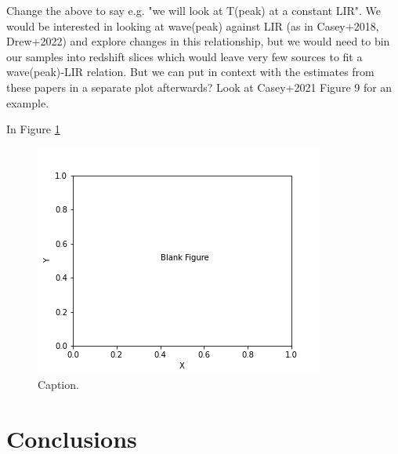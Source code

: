 {\color{red} Change the above to say e.g. "we will look at T(peak) at a constant LIR". We would be interested in looking at wave(peak) against LIR (as in Casey+2018, Drew+2022) and explore changes in this relationship, but we would need to bin our samples into redshift slices which would leave very few sources to fit a wave(peak)-LIR relation. But we can put in context with the estimates from these papers in a separate plot afterwards? Look at Casey+2021 Figure 9 for an example.}

In Figure \ref{fig:wavepeak_lir}

\begin{figure}
	\centering
	\includegraphics[width=0.75\columnwidth]{Figures/blank_figure.png}
	\caption{Caption.}
	\label{fig:wavepeak_lir}
\end{figure}

\section{Conclusions}